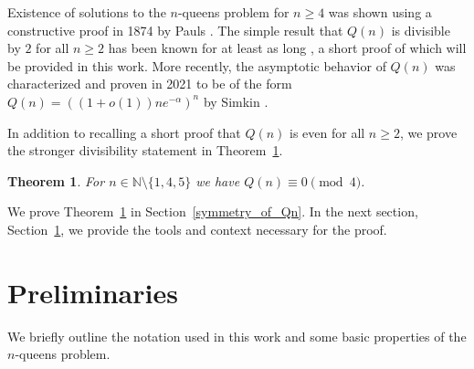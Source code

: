 \documentclass[pdflatex,sn-mathphys-num]{sn-jnl}
\theoremstyle{thmstyleone}
\newtheorem{theorem}{Theorem}
\theoremstyle{thmstyletwo}
\theoremstyle{thmstylethree}
\begin{document}
Existence of solutions to the $n$-queens problem for $n \geq 4$ was shown using a constructive proof 
in 1874 by Pauls \cite{Pauls1874Damenproblem}. The simple result that $Q(n)$ is divisible by $2$ for all 
$n \geq 2$ has been known for at least as long \cite{oeisA000170, kraitchik1953mathematical}, 
a short proof of which will be provided in this work. More recently, 
the asymptotic behavior of $Q(n)$ was characterized and proven in 2021 to be of the form $Q(n) = ((1 + o(1))ne^{-\alpha})^n$
by Simkin \cite{Simkin2023NQueens}.

In addition to recalling a short proof that $Q(n)$ is even for all $n\ge 2$, we prove the stronger divisibility statement
in Theorem~\ref{thm:Qn_divby4_1}.
\begin{theorem} \label{thm:Qn_divby4_1}
    For $n \in \mathbb{N} \setminus \lbrace 1, 4, 5 \rbrace$ we have $Q(n) \equiv 0 \pmod{4}$.
\end{theorem}
We prove Theorem~\ref{thm:Qn_divby4_1} in Section~\ref{symmetry_of_Qn}. In the next section, Section~\ref{background}, we 
provide the tools and context necessary for the proof.

\section{Preliminaries}\label{background}
We briefly outline the notation used in this work and some basic properties of the $n$-queens problem.
\end{document}
